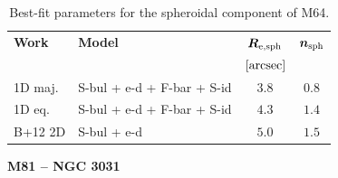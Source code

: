 \documentclass[preprint2]{emulateapj}
\begin{document}
  \begin{table}[h]
  \small
  \caption{Best-fit parameters for the spheroidal component of M64.}
  \begin{center}
  \begin{tabular}{llcc}
  \hline
  {\bf Work} & {\bf Model}   & $\bm R_{\rm e,sph}$    & $\bm n_{\rm sph}$ \\
    &  &  $[\rm arcsec]$ & \\
  \hline
  1D maj. & S-bul + e-d + F-bar + S-id  & $3.8$  &  $0.8$ \\
  1D eq.  & S-bul + e-d + F-bar + S-id  & $4.3$  &  $1.4$ \\
  \hline
  B+12 2D      & S-bul + e-d  & $5.0$  &  $1.5$ \\
  \hline
  \end{tabular}
  \end{center}
  \label{tab:m64}
  \end{table}


  \clearpage\newpage\noindent
  {\bf M81 -- NGC 3031 \\}
\end{document}
